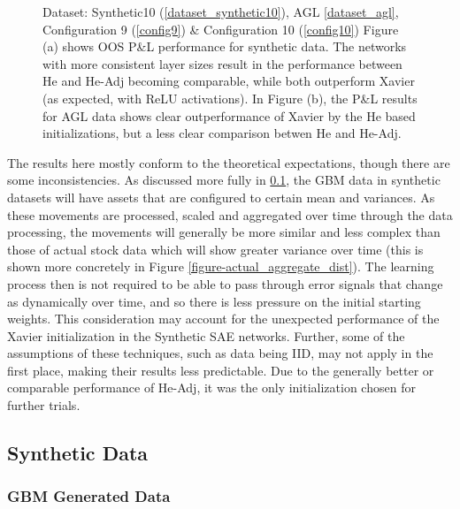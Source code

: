 \documentclass[a4paper,11pt,oneside]{article}
\theoremstyle{plain}
\theoremstyle{definition}
\begin{document}
\begin{figure}[H]
		\caption[OOS P\&L by Weight Initialization]
		{Dataset: Synthetic10 (\ref{dataset_synthetic10}), AGL \ref{dataset_agl}, Configuration 9 (\ref{config9}) \& Configuration 10 (\ref{config10})
			\newline Figure (a) shows OOS P\&L performance for synthetic data. The networks with more consistent layer sizes result in the performance between He and He-Adj becoming comparable, while both outperform Xavier (as expected, with ReLU activations). In Figure (b), the P\&L results for AGL data shows clear outperformance of Xavier by the He based initializations, but a less clear comparison betwen He and He-Adj.}
		\label{figure-pl_init}
	\end{figure}
	
	
	The results here mostly conform to the theoretical expectations, though there are some inconsistencies. As discussed more fully in \ref{results_synth}, the GBM data in synthetic datasets will have assets that are configured to certain mean and variances. As these movements are processed, scaled and aggregated over time through the data processing, the movements will generally be more similar and less complex than those of actual stock data which will show greater variance over time (this is shown more concretely in Figure \ref{figure-actual_aggregate_dist}). The learning process then is not required to be able to pass through error signals that change as dynamically over time, and so there is less pressure on the initial starting weights. This consideration may account for the unexpected performance of the Xavier initialization in the Synthetic SAE networks. Further, some of the assumptions of these techniques, such as data being IID, may not apply in the first place, making their results less predictable.  Due to the generally better or comparable performance of He-Adj, it was the only initialization chosen for further trials.  \newline
	
	\newpage
	\subsection{Synthetic Data}\label{results_synth}
	
	\subsubsection{GBM Generated Data}\label{results_gbm_data}
	
\end{document}
